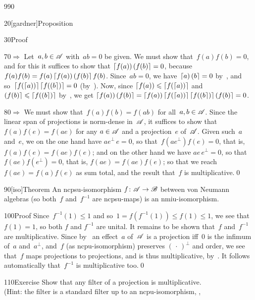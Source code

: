 \begin{parsec}{990}
\begin{point}{20}[gardner]{Proposition}
\begin{point}{30}{Proof}
\begin{point}{70}{$\Longrightarrow$}
Let~$a,b\in\mathscr{A}$ with~$ab=0$ be given.
We must show that~$f(a)f(b)=0$,
and for this it suffices to show that
$\left\lceil f(a)\right)\left(f(b)\right\rceil=0$,
because $f(a)f(b)=f(a)\left\lceil f(a)\right)\left(f(b)\right\rceil f(b)$.
Since~$ab=0$,
we have~$\left\lceil a\right)\left(b\right\rceil=0$ by~,
and so~$\left\lceil f(\left\lceil a\right))\right\rceil\left\lceil f(\left(b\right\rceil)\right\rceil=0$ (by~).
Now,
since $\left\lceil f(a)\right)\leqslant \left\lceil f(\left\lceil a\right))\right\rceil$
	and $\left(f(b)\right\rceil\leqslant \left\lceil f(\left(b\right\rceil)\right\rceil$
	by~,
we get $\left\lceil f(a)\right)\left(f(b)\right\rceil
	= \left\lceil f(a)\right) \left\lceil f(\left\lceil a\right))\right\rceil
	\left\lceil f(\left(b\right\rceil)\right\rceil
	\left(f(b)\right\rceil
	=0$.
\end{point}
\begin{point}{80}{$\Longrightarrow$}%
We must show that~$f(a)f(b)=f(ab)$
for all~$a,b\in \mathscr{A}$.
Since the linear span of projections is norm-dense in~$\mathscr{A}$,
it suffices to show that $f(a)f(e)=f(ae)$
for any $a\in\mathscr{A}$ and a projection~$e$ of~$\mathscr{A}$.
Given such~$a$ and~$e$,
we on the one hand have $ae^\perp\, e=0$,
so that~$f(ae^\perp)f(e)=0$,
that is, $f(a)f(e)=f(ae)f(e)$;
and on the other hand
we have $ae\,e^\perp=0$,
so that~$f(ae)f(e^\perp)=0$,
that is, $f(ae)=f(ae)f(e)$;
so that we reach~$f(ae)=f(a)f(e)$ as sum total,
and the result that~$f$ is multiplicative.\qed
\end{point}
\end{point}
\end{point}
\begin{point}{90}[iso]{Theorem}%
An ncpsu-isomorphism $f\colon \mathscr{A}\to\mathscr{B}$
between von Neumann algebras 
(so both~$f$ and~$f^{-1}$ are ncpsu-maps)
is an nmiu-isomorphism.
\begin{point}{100}{Proof}%
Since~$f^{-1}(1)\leq 1$
and so~$1=f(f^{-1}(1))\leq f(1)\leq 1$,
we see that~$f(1)=1$, so both $f$ and $f^{-1}$ are unital.
It remains to be shown that~$f$ and~$f^{-1}$ are multiplicative.
Since by~ an effect~$a$ of~$\mathscr{A}$
is a projection iff~$0$ is the infimum of~$a$ and~$a^\perp$,
	and~$f$ (as ncpu-isomorphism) preserves $(\,\cdot\,)^\perp$
	and order,
we see that~$f$ maps projections to projections,
and is thus multiplicative, by~.
It follows automatically that~$f^{-1}$ is multiplicative too.\qed
\end{point}
\end{point}
\begin{point}{110}{Exercise}%
Show that any filter of a projection is multiplicative.\\
(Hint: the filter is
a standard filter
up to an
ncpu-isomorphism, ,

\end{point}
\end{parsec}
